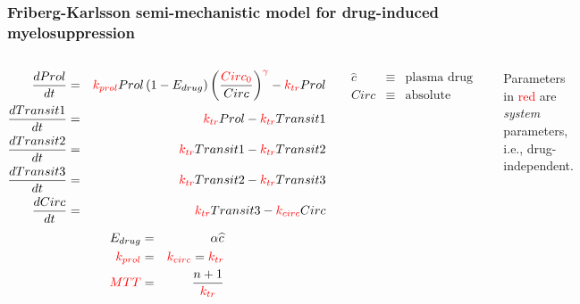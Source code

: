\documentclass{beamer}
\begin{document}
\begin{frame}
  \frametitle{Friberg-Karlsson semi-mechanistic model for
drug-induced myelosuppression}

\begin{columns}
\begin{footnotesize}
  \begin{eqnarray*}
    \frac{dProl}{dt} &=& \textcolor{red}{k_{prol}}Prol\left(1 -
      E_{drug}\right)\left(\frac{\textcolor{red}{Circ_0}}{Circ}\right)^{\textcolor{red}{\gamma}} -
    \textcolor{red}{k_{tr}}Prol \\
\frac{dTransit1}{dt} &=& \textcolor{red}{k_{tr}}Prol - \textcolor{red}{k_{tr}}Transit1 \\
\frac{dTransit2}{dt} &=& \textcolor{red}{k_{tr}}Transit1 - \textcolor{red}{k_{tr}}Transit2 \\
\frac{dTransit3}{dt} &=& \textcolor{red}{k_{tr}}Transit2 - \textcolor{red}{k_{tr}}Transit3 \\
\frac{dCirc}{dt} &=& \textcolor{red}{k_{tr}}Transit3 - \textcolor{red}{k_{circ}}Circ \\
  \end{eqnarray*}
\vspace{-0.25in}
  \begin{eqnarray*}
    E_{drug} &=& \alpha \widehat{c} \\
\textcolor{red}{k_{prol}} &=& \textcolor{red}{k_{circ}} = \textcolor{red}{k_{tr}} \\
\textcolor{red}{MTT} &=& \frac{n + 1}{\textcolor{red}{k_{tr}}}
  \end{eqnarray*}
\end{footnotesize}
\begin{footnotesize}
\begin{eqnarray*}
  \widehat{c} &\equiv& \text{plasma drug concentration} \\
Circ &\equiv& \text{absolute neutrophil count (ANC)}
\end{eqnarray*}
\end{footnotesize}
 
Parameters in \textcolor{red}{red} are {\em system} parameters, i.e., drug-independent.
\end{columns}

\end{frame}
\end{document}
